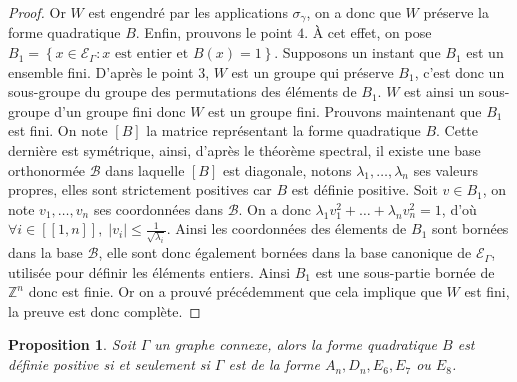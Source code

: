\documentclass[a4paper,11pt]{article}
\newtheorem{prop}[thm]{Proposition}%
\newcommand{\EG}{\mathscr{E}_\Gamma}
\newcommand{\ent}[2]{[\![#1,#2]\!]}
\begin{document}
\begin{proof}
			Or $W$ est engendré par les applications $\sigma_\gamma$, on a donc que $W$ préserve la forme quadratique $B$. Enfin, prouvons le point $4$. À cet effet, on pose $B_1=\left\{ x\in\EG : x\text{ est entier et }B(x)=1 \right\}$. Supposons un instant que $B_1$ est un ensemble fini. D'après le point $3$, $W$ est un groupe qui préserve $B_1$, c'est donc un sous-groupe du groupe des permutations des éléments de $B_1$. $W$ est ainsi un sous-groupe d'un groupe fini donc $W$ est un groupe fini. Prouvons maintenant que $B_1$ est fini. On note $\left[ B \right]$ la matrice représentant la forme quadratique $B$. Cette dernière est symétrique, ainsi, d'après le théorème spectral, il existe une base orthonormée $\mathscr B$ dans laquelle $\left[ B \right]$ est diagonale, notons $\lambda_1,\dots,\lambda_n$ ses valeurs propres, elles sont strictement positives car $B$ est définie positive. Soit $v\in B_1$, on note $v_1,\dots,v_n$ ses coordonnées dans $\mathscr B$. On a donc $\lambda_1v_1^2+\dots+\lambda_nv_n^2=1$, d'où $\forall i \in\ent{1}{n},\;|v_i|\leq\frac{1}{\sqrt{\lambda_i}}$. Ainsi les coordonnées des élements de $B_1$ sont bornées dans la base $\mathscr B$, elle sont donc également bornées dans la base canonique de $\EG$, utilisée pour définir les éléments entiers. Ainsi $B_1$ est une sous-partie bornée de $\mathbb Z^n$ donc est finie. Or on a prouvé précédemment que cela implique que $W$ est fini, la preuve est donc complète.
		\end{proof}
		\begin{prop}
		\label{defpos}
Soit $\Gamma$ un graphe connexe, alors la forme quadratique $B$ est définie positive si et seulement si $\Gamma$ est de la forme $A_n,D_n,E_6,E_7$ ou $E_8$.
		\end{prop}
\end{document}
